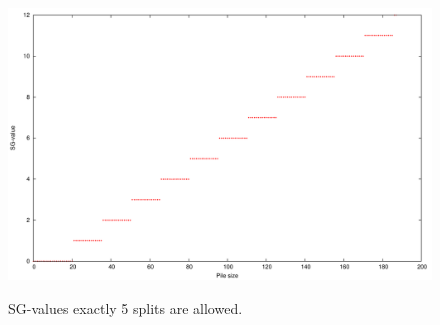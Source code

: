 \documentclass[english,a4paper,twoside]{amsart}
\theoremstyle{lemma}
\begin{document}
\begin{figure}
    \caption{SG-values exactly 5 splits are allowed.}
    \includegraphics[width=\linewidth]{../plots/fixed6.pdf}
    \label{fig:fixed5}
\end{figure}
\end{document}
